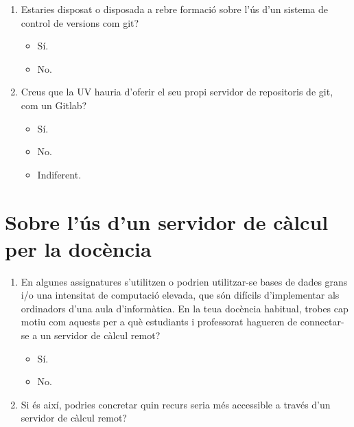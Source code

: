 \documentclass[a4paper,12pt]{article}
\newcounter{preg}[section]
\begin{document}
\begin{enumerate}
\item {} Estaries disposat o disposada a rebre formació sobre l'ús d'un sistema de control de versions
      com \textsf{git}?
   \begin{itemize}
   \item Sí.
   \item No.
   \end{itemize}

\item {} Creus que la UV hauria d'oferir el seu propi  servidor de repositoris de \textsf{git}, com
      un Gitlab? \cite{Paderborn2023,PereiraBraga2023}
   \begin{itemize}
   \item Sí.
   \item No.
   \item Indiferent.
   \end{itemize}
\end{enumerate}

\section{Sobre l'ús d'un servidor de càlcul per la docència}
\begin{enumerate}
\item {} En algunes assignatures s'utilitzen o podrien utilitzar-se bases de dades grans i/o una intensitat
      de computació elevada, que són difícils d'implementar als ordinadors d'una aula d'informàtica.
      En la teua docència habitual, trobes cap motiu com aquests per a què estudiants i professorat
      hagueren de connectar-se a un servidor de càlcul remot?
   \begin{itemize}
   \item Sí.
   \item No.
   \end{itemize}

\item Si és així, podries concretar quin recurs seria més accessible a través d'un servidor de
      càlcul remot?
\vspace*{1cm}
\end{enumerate}



\end{document}

